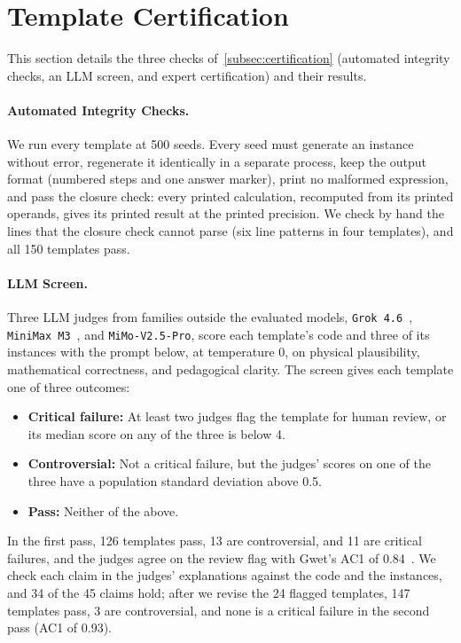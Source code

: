 \section{Template Certification}
\label{appendix:certification}

This section details the three checks of~\autoref{subsec:certification} (automated integrity
checks, an LLM screen, and expert certification) and their results.

\paragraph{Automated Integrity Checks.} We run every template at 500 seeds.
Every seed must generate an instance without error, regenerate it identically in a separate
process, keep the output format (numbered steps and one answer marker), print no malformed
expression, and pass the closure check: every printed calculation, recomputed from its printed
operands, gives its printed result at the printed precision.
We check by hand the lines that the closure check cannot parse (six line patterns in four
templates), and all 150 templates pass.

\paragraph{LLM Screen.} Three LLM judges from families outside the evaluated models,
\texttt{Grok 4.6}~\citep{grok46}, \texttt{MiniMax M3}~\citep{minimaxm3}, and
\texttt{MiMo-V2.5-Pro}, score each template's code and three of its instances with the prompt
below, at temperature 0, on physical plausibility, mathematical correctness, and pedagogical
clarity.
The screen gives each template one of three outcomes:
\begin{itemize}[nosep, leftmargin=*]
\item \textbf{Critical failure:} At least two judges flag the template for human review, or its
median score on any of the three is below 4.
\item \textbf{Controversial:} Not a critical failure, but the judges' scores on one of the three
have a population standard deviation above 0.5.
\item \textbf{Pass:} Neither of the above.
\end{itemize}

In the first pass, 126 templates pass, 13 are controversial, and 11 are critical failures, and the
judges agree on the review flag with Gwet's AC1 of 0.84~\citep{gwet2008}.
We check each claim in the judges' explanations against the code and the instances, and 34 of the
45 claims hold; after we revise the 24 flagged templates, 147 templates pass, 3 are controversial,
and none is a critical failure in the second pass (AC1 of 0.93).

